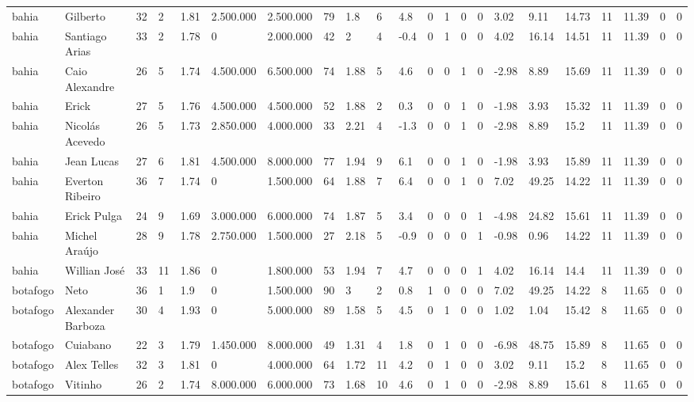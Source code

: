 \begin{longtable}{llllllllllllllllllllll}
bahia & Gilberto & 32 & 2 & 1.81 & 2.500.000 & 2.500.000 & 79 & 1.8 & 6 & 4.8 & 0 & 1 & 0 & 0 & 3.02 & 9.11 & 14.73 & 11 & 11.39 & 0 & 0 \\
bahia & Santiago Arias & 33 & 2 & 1.78 & 0 & 2.000.000 & 42 & 2 & 4 & -0.4 & 0 & 1 & 0 & 0 & 4.02 & 16.14 & 14.51 & 11 & 11.39 & 0 & 0 \\
bahia & Caio Alexandre & 26 & 5 & 1.74 & 4.500.000 & 6.500.000 & 74 & 1.88 & 5 & 4.6 & 0 & 0 & 1 & 0 & -2.98 & 8.89 & 15.69 & 11 & 11.39 & 0 & 0 \\
bahia & Erick & 27 & 5 & 1.76 & 4.500.000 & 4.500.000 & 52 & 1.88 & 2 & 0.3 & 0 & 0 & 1 & 0 & -1.98 & 3.93 & 15.32 & 11 & 11.39 & 0 & 0 \\
bahia & Nicolás Acevedo & 26 & 5 & 1.73 & 2.850.000 & 4.000.000 & 33 & 2.21 & 4 & -1.3 & 0 & 0 & 1 & 0 & -2.98 & 8.89 & 15.2 & 11 & 11.39 & 0 & 0 \\
bahia & Jean Lucas & 27 & 6 & 1.81 & 4.500.000 & 8.000.000 & 77 & 1.94 & 9 & 6.1 & 0 & 0 & 1 & 0 & -1.98 & 3.93 & 15.89 & 11 & 11.39 & 0 & 0 \\
bahia & Everton Ribeiro & 36 & 7 & 1.74 & 0 & 1.500.000 & 64 & 1.88 & 7 & 6.4 & 0 & 0 & 1 & 0 & 7.02 & 49.25 & 14.22 & 11 & 11.39 & 0 & 0 \\
bahia & Erick Pulga & 24 & 9 & 1.69 & 3.000.000 & 6.000.000 & 74 & 1.87 & 5 & 3.4 & 0 & 0 & 0 & 1 & -4.98 & 24.82 & 15.61 & 11 & 11.39 & 0 & 0 \\
bahia & Michel Araújo & 28 & 9 & 1.78 & 2.750.000 & 1.500.000 & 27 & 2.18 & 5 & -0.9 & 0 & 0 & 0 & 1 & -0.98 & 0.96 & 14.22 & 11 & 11.39 & 0 & 0 \\
bahia & Willian José & 33 & 11 & 1.86 & 0 & 1.800.000 & 53 & 1.94 & 7 & 4.7 & 0 & 0 & 0 & 1 & 4.02 & 16.14 & 14.4 & 11 & 11.39 & 0 & 0 \\
botafogo & Neto & 36 & 1 & 1.9 & 0 & 1.500.000 & 90 & 3 & 2 & 0.8 & 1 & 0 & 0 & 0 & 7.02 & 49.25 & 14.22 & 8 & 11.65 & 0 & 0 \\
botafogo & Alexander Barboza & 30 & 4 & 1.93 & 0 & 5.000.000 & 89 & 1.58 & 5 & 4.5 & 0 & 1 & 0 & 0 & 1.02 & 1.04 & 15.42 & 8 & 11.65 & 0 & 0 \\
botafogo & Cuiabano & 22 & 3 & 1.79 & 1.450.000 & 8.000.000 & 49 & 1.31 & 4 & 1.8 & 0 & 1 & 0 & 0 & -6.98 & 48.75 & 15.89 & 8 & 11.65 & 0 & 0 \\
botafogo & Alex Telles & 32 & 3 & 1.81 & 0 & 4.000.000 & 64 & 1.72 & 11 & 4.2 & 0 & 1 & 0 & 0 & 3.02 & 9.11 & 15.2 & 8 & 11.65 & 0 & 0 \\
botafogo & Vitinho & 26 & 2 & 1.74 & 8.000.000 & 6.000.000 & 73 & 1.68 & 10 & 4.6 & 0 & 1 & 0 & 0 & -2.98 & 8.89 & 15.61 & 8 & 11.65 & 0 & 0 \\

\end{longtable}
